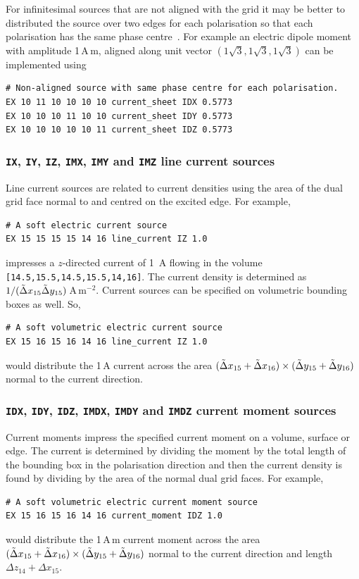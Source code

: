 \documentclass[onecolumn,a4paper]{article}
\numberwithin{equation}{section}
\begin{document}
For infinitesimal sources that are not aligned with the grid it may be better to distributed the source over two edges
for each polarisation so that each polarisation has the same phase centre~\cite{Noetscher2012}. For example an electric
dipole moment with amplitude 1\,A\,m, aligned along unit vector $(1\sqrt{3},1\sqrt{3},1\sqrt{3})$ can be implemented using
\begin{verbatim}
# Non-aligned source with same phase centre for each polarisation.
EX 10 11 10 10 10 10 current_sheet IDX 0.5773
EX 10 10 10 11 10 10 current_sheet IDY 0.5773
EX 10 10 10 10 10 11 current_sheet IDZ 0.5773
\end{verbatim}

\subsubsection{\texttt{IX}, \texttt{IY}, \texttt{IZ}, \texttt{IMX}, \texttt{IMY} and \texttt{IMZ} line current sources}

Line current sources are related to current densities using the area of the dual grid face normal to and centred on the 
excited edge. For example, 
\begin{verbatim}
# A soft electric current source
EX 15 15 15 15 14 16 line_current IZ 1.0
\end{verbatim}
impresses a $z$-directed current of 1\, A flowing in the volume 
\texttt{[14.5,15.5,14.5,15.5,14,16]}. The current density is determined as
$1/(\tilde{\Delta} x_{15} \tilde{\Delta} y_{15})$\,A\,m$^{-2}$. Current sources can be specified
on volumetric bounding boxes as well. So,
\begin{verbatim}
# A soft volumetric electric current source
EX 15 16 15 16 14 16 line_current IZ 1.0
\end{verbatim}
would distribute the 1\,A current across the area $(\tilde{\Delta} x_{15} + \tilde{\Delta} x_{16})\times (\tilde{\Delta} y_{15} + \tilde{\Delta} y_{16}) $ 
normal to the current direction.

\subsubsection{\texttt{IDX}, \texttt{IDY}, \texttt{IDZ}, \texttt{IMDX}, \texttt{IMDY} and \texttt{IMDZ} current moment sources}

Current moments impress the specified current moment on a volume, surface or edge. The current
is determined by dividing the moment by the total length of the bounding box in the polarisation
direction and then the current density is found by dividing by the area of the normal dual grid
faces. For example,
\begin{verbatim}
# A soft volumetric electric current moment source
EX 15 16 15 16 14 16 current_moment IDZ 1.0
\end{verbatim}
would distribute the 1\,A\,m current moment across the area $(\tilde{\Delta} x_{15} + \tilde{\Delta} x_{16})\times (\tilde{\Delta} y_{15} + \tilde{\Delta} y_{16}) $ 
normal to the current direction and length $\Delta z_{14}+\Delta x_{15}$.
\end{document}

